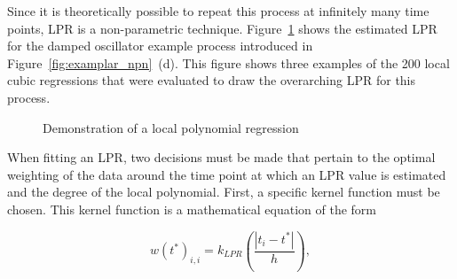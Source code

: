 \documentclass[man, floatsintext]{apa7}
\begin{document}
Since it is theoretically possible to repeat this process at infinitely many
time points, LPR is a non-parametric technique. Figure~\ref{fig:locpol_dem}
shows the estimated LPR for the damped oscillator example process introduced in
Figure~\ref{fig:examplar_npn}~(d). This figure shows three examples of the 200
local cubic regressions that were evaluated to draw the overarching LPR for
this process.

\begin{figure}[!t]
  \caption{Demonstration of a local polynomial regression}
  \label{fig:locpol_dem}
\end{figure}

When fitting an LPR, two decisions must be made that pertain to the optimal
weighting of the data around the time point at which an LPR value is estimated
and the degree of the local polynomial. First, a specific kernel function must
be chosen. This kernel function is a mathematical equation of the form

\begin{equation}
  w(t^*)_{i, i} = k_{LPR}(\frac{|t_i - t^*|}{h}),
\end{equation}
\end{document}
